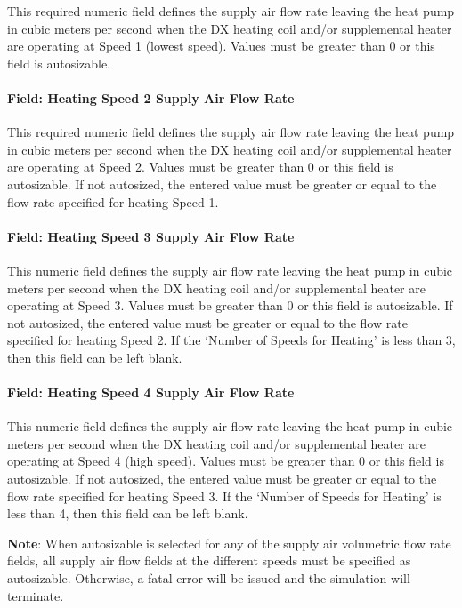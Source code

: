 This required numeric field defines the supply air flow rate leaving the heat pump in cubic meters per second when the DX heating coil and/or supplemental heater are operating at Speed 1 (lowest speed). Values must be greater than 0 or this field is autosizable.

\paragraph{Field: Heating Speed 2 Supply Air Flow Rate}\label{field-heating-speed-2-supply-air-flow-rate}

This required numeric field defines the supply air flow rate leaving the heat pump in cubic meters per second when the DX heating coil and/or supplemental heater are operating at Speed 2. Values must be greater than 0 or this field is autosizable. If not autosized, the entered value must be greater or equal to the flow rate specified for heating Speed 1.

\paragraph{Field: Heating Speed 3 Supply Air Flow Rate}\label{field-heating-speed-3-supply-air-flow-rate}

This numeric field defines the supply air flow rate leaving the heat pump in cubic meters per second when the DX heating coil and/or supplemental heater are operating at Speed 3. Values must be greater than 0 or this field is autosizable. If not autosized, the entered value must be greater or equal to the flow rate specified for heating Speed 2. If the `Number of Speeds for Heating' is less than 3, then this field can be left blank.

\paragraph{Field: Heating Speed 4 Supply Air Flow Rate}\label{field-heating-speed-4-supply-air-flow-rate}

This numeric field defines the supply air flow rate leaving the heat pump in cubic meters per second when the DX heating coil and/or supplemental heater are operating at Speed 4 (high speed). Values must be greater than 0 or this field is autosizable. If not autosized, the entered value must be greater or equal to the flow rate specified for heating Speed 3. If the `Number of Speeds for Heating' is less than 4, then this field can be left blank.

\textbf{Note}: When autosizable is selected for any of the supply air volumetric flow rate fields, all supply air flow fields at the different speeds must be specified as autosizable. Otherwise, a fatal error will be issued and the simulation will terminate.

